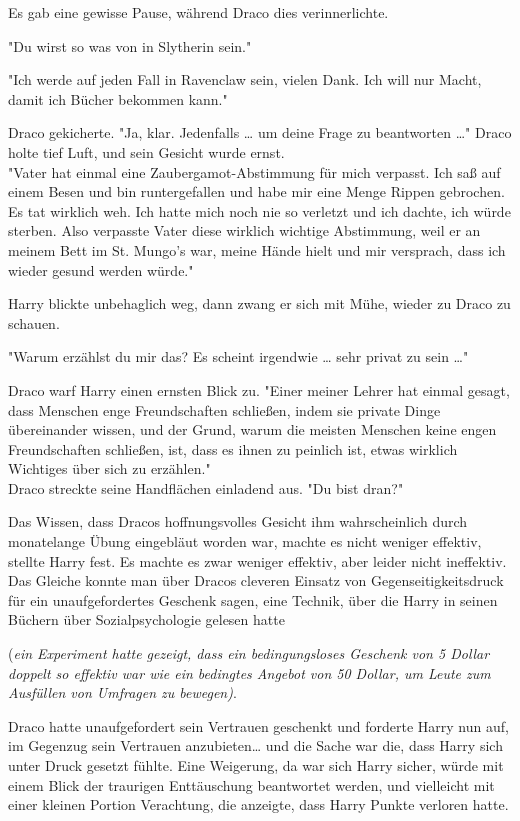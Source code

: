 {Es gab eine gewisse Pause, während Draco dies verinnerlichte.

"Du wirst so was von in Slytherin sein."

"Ich werde auf jeden Fall in Ravenclaw sein, vielen Dank. Ich will nur Macht, damit ich Bücher bekommen kann."

Draco gekicherte. "Ja, klar. Jedenfalls … um deine Frage zu beantworten …" Draco holte tief Luft, und sein Gesicht wurde ernst.\\ "Vater hat einmal eine Zaubergamot-Abstimmung für mich verpasst. Ich saß auf einem Besen und bin runtergefallen und habe mir eine Menge Rippen gebrochen. Es tat wirklich weh. Ich hatte mich noch nie so verletzt und ich dachte, ich würde sterben. Also verpasste Vater diese wirklich wichtige Abstimmung, weil er an meinem Bett im St. Mungo's war, meine Hände hielt und mir versprach, dass ich wieder gesund werden würde."

Harry blickte unbehaglich weg, dann zwang er sich mit Mühe, wieder zu Draco zu schauen.

"Warum erzählst du mir das? Es scheint irgendwie … sehr privat zu sein …"

Draco warf Harry einen ernsten Blick zu. "Einer meiner Lehrer hat einmal gesagt, dass Menschen enge Freundschaften schließen, indem sie private Dinge übereinander wissen, und der Grund, warum die meisten Menschen keine engen Freundschaften schließen, ist, dass es ihnen zu peinlich ist, etwas wirklich Wichtiges über sich zu erzählen."\\ Draco streckte seine Handflächen einladend aus. "Du bist dran?"

Das Wissen, dass Dracos hoffnungsvolles Gesicht ihm wahrscheinlich durch monatelange Übung eingebläut worden war, machte es nicht weniger effektiv, stellte Harry fest. Es machte es zwar weniger effektiv, aber leider nicht ineffektiv. Das Gleiche konnte man über Dracos cleveren Einsatz von Gegenseitigkeitsdruck für ein unaufgefordertes Geschenk sagen, eine Technik, über die Harry in seinen Büchern über Sozialpsychologie gelesen hatte

(\emph{ein Experiment hatte gezeigt, dass ein bedingungsloses Geschenk von 5 Dollar doppelt so effektiv war wie ein bedingtes Angebot von 50 Dollar, um Leute zum Ausfüllen von Umfragen zu bewegen)}.

Draco hatte unaufgefordert sein Vertrauen geschenkt und forderte Harry nun auf, im Gegenzug sein Vertrauen anzubieten… und die Sache war die, dass Harry sich unter Druck gesetzt fühlte. Eine Weigerung, da war sich Harry sicher, würde mit einem Blick der traurigen Enttäuschung beantwortet werden, und vielleicht mit einer kleinen Portion Verachtung, die anzeigte, dass Harry Punkte verloren hatte.

}
